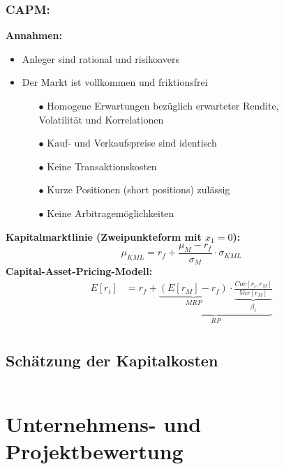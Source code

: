 \documentclass[leqno]{scrartcl}
\begin{document}
\begin{multicols}{3}
\subsubsection{CAPM:}
\textbf{Annahmen:}
  \begin{itemize}
    \item Anleger sind rational und risikoavers
    \item Der Markt ist vollkommen und friktionsfrei
    \begin{itemize}
      \item[$\bullet$] Homogene Erwartungen bezüglich erwarteter Rendite,\\ Volatilität und Korrelationen 
      \item[$\bullet$] Kauf- und Verkaufspreise sind identisch
      \item[$\bullet$] Keine Transaktionskosten
      \item[$\bullet$] Kurze Positionen (short positions) zulässig
      \item[$\bullet$] Keine Arbitragemöglichkeiten
    \end{itemize}
  \end{itemize} 
\textbf{Kapitalmarktlinie (Zweipunkteform mit $x_1=0$):}
  \begin{equation}
    \mu_{KML} = r_f + \frac{\mu_M - r_f}{\sigma_M}\cdot \sigma_{KML}
  \end{equation}
\textbf{Capital-Asset-Pricing-Modell:}
  \begin{equation}
    \begin{split}
      E[r_i] &= r_f +  \underbrace{\underbrace{(E[r_M] - r_f)}_{MRP} \cdot \underbrace{\frac{Cov[r_i,r_M]}{Var[r_M]}}_{\beta_i}}_{RP}\\
    \end{split}
  \end{equation}

\subsection{Schätzung der Kapitalkosten}

  \begin{equation}
  \end{equation}
  \begin{equation}
  \end{equation}

\section{Unternehmens- und Projektbewertung}


\end{multicols}
\end{document}
